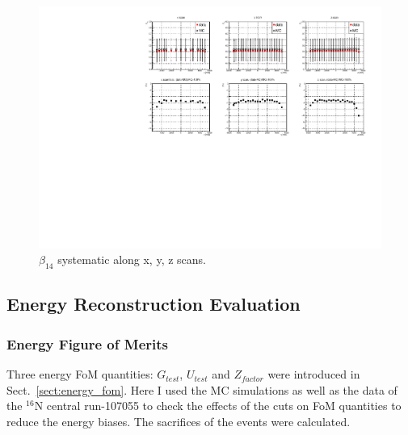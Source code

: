\begin{figure}[htbp]
	\centering
	\includegraphics[width=15cm]{beta14_xyzScans.pdf}
	\caption{$\beta_{14}$ systematic along x, y, z scans.}
	\label{beta14_XYZscans}
\end{figure}


\subsection{Energy Reconstruction Evaluation}
\subsubsection{Energy Figure of Merits}\label{sect:energy_fomTest}
Three energy FoM quantities: $G_{test}$, $U_{test}$ and $Z_{factor}$ were introduced in Sect.~\ref{sect:energy_fom}.
Here I used the MC simulations as well as the data of the $^{16}$N central run-107055 to check the effects of the cuts on FoM quantities to　reduce the energy biases. The sacrifices of the events were calculated. 



